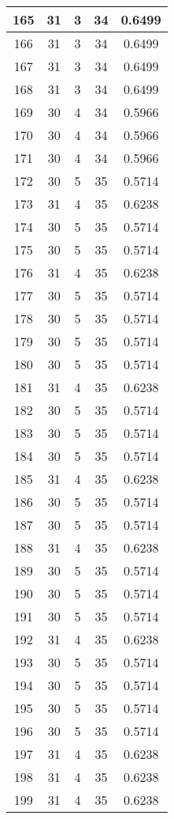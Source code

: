 \documentclass[letterpaper, 12pt]{article}
\begin{document}
\begin{longtable}{|c|c|c|c|c|}
\hline
165 & 31 & 3 & 34 & 0.6499 \\
\hline
166 & 31 & 3 & 34 & 0.6499 \\
\hline
167 & 31 & 3 & 34 & 0.6499 \\
\hline
168 & 31 & 3 & 34 & 0.6499 \\
\hline
169 & 30 & 4 & 34 & 0.5966 \\
\hline
170 & 30 & 4 & 34 & 0.5966 \\
\hline
171 & 30 & 4 & 34 & 0.5966 \\
\hline
172 & 30 & 5 & 35 & 0.5714 \\
\hline
173 & 31 & 4 & 35 & 0.6238 \\
\hline
174 & 30 & 5 & 35 & 0.5714 \\
\hline
175 & 30 & 5 & 35 & 0.5714 \\
\hline
176 & 31 & 4 & 35 & 0.6238 \\
\hline
177 & 30 & 5 & 35 & 0.5714 \\
\hline
178 & 30 & 5 & 35 & 0.5714 \\
\hline
179 & 30 & 5 & 35 & 0.5714 \\
\hline
180 & 30 & 5 & 35 & 0.5714 \\
\hline
181 & 31 & 4 & 35 & 0.6238 \\
\hline
182 & 30 & 5 & 35 & 0.5714 \\
\hline
183 & 30 & 5 & 35 & 0.5714 \\
\hline
184 & 30 & 5 & 35 & 0.5714 \\
\hline
185 & 31 & 4 & 35 & 0.6238 \\
\hline
186 & 30 & 5 & 35 & 0.5714 \\
\hline
187 & 30 & 5 & 35 & 0.5714 \\
\hline
188 & 31 & 4 & 35 & 0.6238 \\
\hline
189 & 30 & 5 & 35 & 0.5714 \\
\hline
190 & 30 & 5 & 35 & 0.5714 \\
\hline
191 & 30 & 5 & 35 & 0.5714 \\
\hline
192 & 31 & 4 & 35 & 0.6238 \\
\hline
193 & 30 & 5 & 35 & 0.5714 \\
\hline
194 & 30 & 5 & 35 & 0.5714 \\
\hline
195 & 30 & 5 & 35 & 0.5714 \\
\hline
196 & 30 & 5 & 35 & 0.5714 \\
\hline
197 & 31 & 4 & 35 & 0.6238 \\
\hline
198 & 31 & 4 & 35 & 0.6238 \\
\hline
199 & 31 & 4 & 35 & 0.6238 \\
\hline
\end{longtable}
\end{document}
